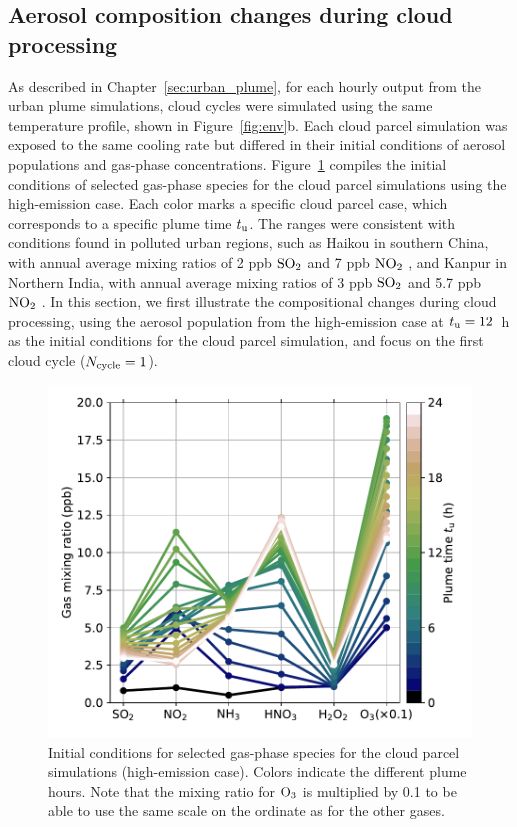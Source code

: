 \documentclass[edeposit,fullpage]{uiucthesis2009}
\begin{document}
\subsection{Aerosol composition changes during cloud processing}
\label{sec:cloud}
As described in Chapter~\ref{sec:urban_plume}, for each hourly output
from the urban plume simulations, cloud cycles were simulated using
the same temperature profile, shown in Figure~\ref{fig:env}b.
Each cloud parcel simulation was exposed to the same cooling
  rate but differed in their initial conditions of aerosol populations
  and gas-phase concentrations. Figure~\ref{fig:cases-gases} compiles
  the initial conditions of selected gas-phase species for the cloud
  parcel simulations using the high-emission case. Each color marks a
  specific cloud parcel case, which corresponds to a specific plume
  time $t_{\rm u}$. The ranges were consistent with conditions found
  in polluted urban regions, such as Haikou in southern China, with
  annual average mixing ratios of 2 ppb $\rm SO_2$ and 7 ppb $\rm
  NO_2$ \citep{wang2014spatial}, and Kanpur in Northern India, with
  annual average mixing ratios of 3 ppb $\rm SO_2$ and 5.7 ppb $\rm
  NO_2$ \citep{gaur2014four}. In this section, we first illustrate
the compositional changes during cloud processing, using the aerosol
population from the high-emission case at $t_{\rm u} =12$~h
as the initial conditions for the cloud parcel simulation, and focus
on the first cloud cycle ($N_{\rm cycle}=1$).

 \begin{figure}
    \centering
    \includegraphics[scale=0.6]{chap3_figs/fig3.pdf}
    \caption{Initial conditions for selected gas-phase species
        for the cloud parcel simulations (high-emission case). Colors
        indicate the different plume hours. Note that the mixing ratio
        for $\rm O_3$ is multiplied by 0.1 to be able to use the same
        scale on the ordinate as for the other gases.}
    \label{fig:cases-gases}
\end{figure}
\end{document}
